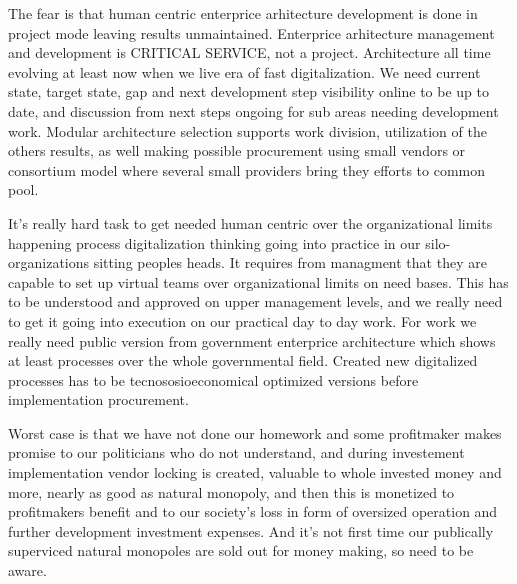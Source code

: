The fear is that human centric enterprice arhitecture development is done in
project mode leaving results unmaintained. Enterprice arhitecture management
and development is CRITICAL SERVICE, not a project\allowbreak\cite{VM_GBEA}.
Architecture all time evolving at least now when we live era of fast
digitalization. We need current state, target state, gap and next development
step visibility online to be up to date, and discussion from next steps
ongoing for sub areas needing development work. Modular architecture selection
supports work division, utilization of the others results, as well making
possible procurement using small vendors or consortium model where several
small providers bring they efforts to common pool.

It's really hard task to get needed human centric over the organizational
limits happening process digitalization thinking going into practice in our
silo-organizations sitting peoples heads. It requires from managment that they
are capable to set up virtual teams over organizational limits on need bases.
This has to be understood and approved on upper management levels, and we
really need to get it going into execution on our practical day to day work.
For work we really need public version from government enterprice
architecture\allowbreak\cite{Kukkonen2025} which shows at least processes over
the whole governmental field. Created new digitalized processes has to be
tecnososioeconomical optimized versions before implementation procurement.

Worst case is that we have not done our homework and some profitmaker makes
promise to our politicians who do not understand, and during investement
implementation vendor locking is created, valuable to whole invested money
and more, nearly as good as natural monopoly, and then this is monetized to
profitmakers benefit and to our society's loss in form of oversized operation
and further development investment expenses. And it's not first time our
publically superviced natural monopoles are sold out for money making, so
need to be aware.
